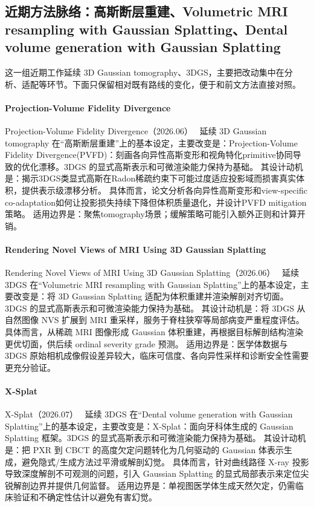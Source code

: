 
\subsection{近期方法脉络：高斯断层重建、Volumetric MRI resampling with Gaussian Splatting、Dental volume generation with Gaussian Splatting}

这一组近期工作延续 3D Gaussian tomography、3DGS，主要把改动集中在分析、适配等环节。下面只保留相对既有路线的变化，便于和前文方法直接对照。

\paragraph{Projection-Volume Fidelity Divergence}
Projection-Volume Fidelity Divergence（2026.06）~\cite{2606_22525} 延续 3D Gaussian tomography 在“高斯断层重建”上的基本设定，主要改变是：Projection-Volume Fidelity Divergence(PVFD)：刻画各向异性高斯变形和视角特化primitive协同导致的优化漂移。3DGS 的显式高斯表示和可微渲染能力保持为基础。
其设计动机是：揭示3DGS类显式高斯在Radon稀疏约束下可能过度适应投影域而损害真实体积，提供表示级漂移分析。
具体而言，论文分析各向异性高斯变形和view-specific co-adaptation如何让投影损失持续下降但体积质量退化，并设计PVFD mitigation策略。
适用边界是：聚焦tomography场景；缓解策略可能引入额外正则和计算开销。

\paragraph{Rendering Novel Views of MRI Using 3D Gaussian Splatting}
Rendering Novel Views of MRI Using 3D Gaussian Splatting（2026.06）~\cite{2606_26236} 延续 3DGS 在“Volumetric MRI resampling with Gaussian Splatting”上的基本设定，主要改变是：将 3D Gaussian Splatting 适配为体积重建并渲染解剖对齐切面。3DGS 的显式高斯表示和可微渲染能力保持为基础。
其设计动机是：将 3DGS 从自然图像 NVS 扩展到 MRI 重采样，服务于脊柱狭窄等局部病变严重程度评估。
具体而言，从稀疏 MRI 图像形成 Gaussian 体积重建，再根据目标解剖结构渲染更优切面，供后续 ordinal severity grade 预测。
适用边界是：医学体数据与 3DGS 原始相机成像假设差异较大，临床可信度、各向异性采样和诊断安全性需要更充分验证。

\paragraph{X-Splat}
X-Splat（2026.07）~\cite{2607_02099} 延续 3DGS 在“Dental volume generation with Gaussian Splatting”上的基本设定，主要改变是：X-Splat：面向牙科体生成的 Gaussian Splatting 框架。3DGS 的显式高斯表示和可微渲染能力保持为基础。
其设计动机是：把 PXR 到 CBCT 的高度欠定问题转化为几何驱动的 Gaussian 体表示生成，避免隐式/生成方法过平滑或解剖幻觉。
具体而言，针对曲线路径 X-ray 投影导致深度解剖不可观测的问题，引入 Gaussian Splatting 的显式局部表示来定位尖锐解剖边界并提供几何监督。
适用边界是：单视图医学体生成天然欠定，仍需临床验证和不确定性估计以避免有害幻觉。
